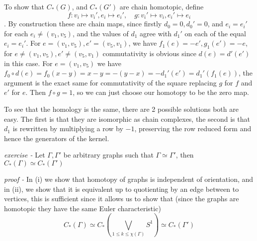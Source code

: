 \documentclass[11pt]{article}
\theoremstyle{definition}
\begin{document}
    To show that \(C_*(G)\), and \(C_*(G')\) are chain homotopic, define \[f:v_i \mapsto v_i', e_i \mapsto e_i', \quad g: v_i' \mapsto v_i, e_i' \mapsto e_i\].
    By construction these are chain maps, since firstly \(d_0 = 0, d_0' = 0\), and \(e_i = e_i'\) for each \(e_i \neq (v_1,v_5)\), and the values of \(d_1\) agree with \(d_1'\) on each of the equal \(e_i = e_i'\). For \(e = (v_1,v_5), e' = (v_5,v_1)\), we have \(f_1(e) = -e',g_1(e')=-e\), for \(e \neq (v_1,v_5), e' \neq (v_5,v_1)\) commutativity is obvious since \(d(e) = d'(e')\) in this case. For \(e = (v_1,v_5)\) we have \(f_0 \circ d(e) = f_0(x-y) = x-y = -(y-x) = -d_1'(e') = d_1'(f_1(e))\), the argument is the exact same for commutativity of the square replacing \(g\) for \(f\) and \(e'\) for \(e\). Then \(f \circ g = 1\), so we can just choose our homotopy to be the zero map.

    To see that the homology is the same, there are 2 possible solutions both are easy. The first is that they are isomorphic as chain complexes, the second is that \(d_1\) is rewritten by multiplying a row by \(-1\), preserving the row reduced form and hence the generators of the kernel.




    
    \emph{exercise - }\label{HEx4} Let \(\Gamma, \Gamma'\) be arbitrary graphs such that \(\Gamma \simeq \Gamma'\), then \(C_*(\Gamma) \simeq C_*(\Gamma')\)

    \emph{proof - } In (i) we show that homotopy of graphs is independent of orientation, and in (ii), we show that it is equivalent up to quotienting by an edge between to vertices, this is sufficient since it allows us to show that (since the graphs are homotopic they have the same Euler characteristic)
    \[C_*(\Gamma) \simeq C_*(\bigvee_{1 \leq k \leq \chi(\Gamma)} S^1) \simeq C_*(\Gamma')\]
\end{document}
